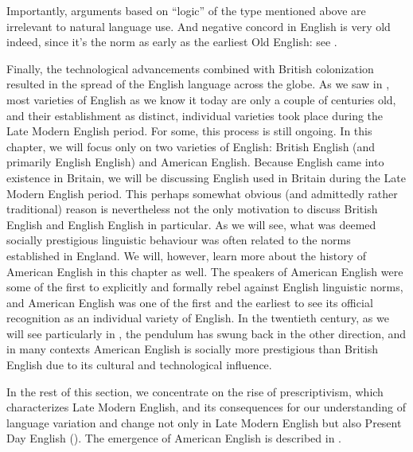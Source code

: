 \noindent Importantly, arguments based on ``logic'' of the type mentioned above are irrelevant to natural language use. And negative concord in English is very old indeed, since it's the norm as early as the earliest Old English: see .

Finally, the technological advancements combined with British colonization resulted in the spread of the English language across the globe. As we saw in , most varieties of English as we know it today are only a couple of centuries old, and their establishment as distinct, individual varieties took place during the Late Modern English period. For some, this process is still ongoing. In this chapter, we will focus only on two varieties of English: British English (and primarily English English) and American English. Because English came into existence in Britain, we will be discussing English used in Britain during the Late Modern English period. This perhaps somewhat obvious (and admittedly rather traditional) reason is nevertheless not the only motivation to discuss British English and English English in particular. As we will see, what was deemed socially prestigious linguistic behaviour was often related to the norms established in England. We will, however, learn more about the history of American English in this chapter as well. The speakers of American English were some of the first to explicitly and formally rebel against English linguistic norms, and American English was one of the first and the earliest to see its official recognition as an individual variety of English. In the twentieth century, as we will see particularly in , the pendulum has swung back in the other direction, and in many contexts American English is socially more prestigious than British English due to its cultural and technological influence.

In the rest of this section, we concentrate on the rise of prescriptivism, which characterizes Late Modern English, and its consequences for our understanding of language variation and change not only in Late Modern English but also Present Day English (). The emergence of American English is described in .

